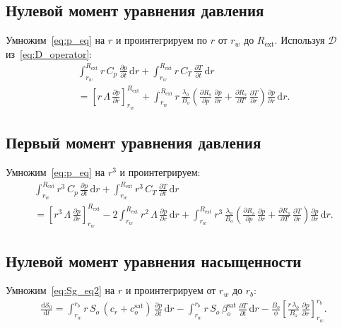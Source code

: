 \documentclass[12pt,a4paper]{article}
\newcommand{\dd}{\mathrm{d}}
\newcommand{\pp}{\partial}
\newcommand{\ext}{\mathrm{ext}}
\newcommand{\sat}{\mathrm{sat}}
\begin{document}
\subsection{Нулевой момент уравнения давления}

Умножим~\eqref{eq:p_eq} на $r$ и проинтегрируем по $r$
от $r_w$ до $R_\ext$. Используя $\mathcal{D}$
из~\eqref{eq:D_operator}:
\begin{multline}\label{eq:moment0}
    \int_{r_w}^{R_\ext} r\,C_p\,\frac{\pp p}{\pp t}\,\dd r
    + \int_{r_w}^{R_\ext} r\,C_T\,\frac{\pp T}{\pp t}\,\dd r
   \\
    = \left[r\,\Lambda\,\frac{\pp p}{\pp r}\right]_{r_w}^{R_\ext}
    + \int_{r_w}^{R_\ext}
      r\,\frac{\lambda_o}{B_o}\!\left(
        \frac{\pp R_s}{\pp p}\,\frac{\pp p}{\pp r}
        + \frac{\pp R_s}{\pp T}\,\frac{\pp T}{\pp r}
      \right)\frac{\pp p}{\pp r}\,\dd r.
\end{multline}



\subsection{Первый момент уравнения давления}

Умножим~\eqref{eq:p_eq} на $r^3$ и проинтегрируем:
\begin{multline}\label{eq:moment1}
  \int_{r_w}^{R_\ext} r^3\,C_p\,\frac{\pp p}{\pp t}\,\dd r
  + \int_{r_w}^{R_\ext} r^3\,C_T\,\frac{\pp T}{\pp t}\,\dd r \\
  = \left[r^3\,\Lambda\,\frac{\pp p}{\pp r}\right]_{r_w}^{R_\ext}
    - 2\int_{r_w}^{R_\ext} r^2\,\Lambda\,\frac{\pp p}{\pp r}\,\dd r
  + \int_{r_w}^{R_\ext}
    r^3\,\frac{\lambda_o}{B_o}\!\left(
      \frac{\pp R_s}{\pp p}\,\frac{\pp p}{\pp r}
      + \frac{\pp R_s}{\pp T}\,\frac{\pp T}{\pp r}
    \right)\frac{\pp p}{\pp r}\,\dd r.
\end{multline}

\subsection{Нулевой момент уравнения насыщенности}

Умножим~\eqref{eq:Sg_eq2} на $r$ и проинтегрируем от $r_w$ до $r_b$:
\begin{multline}\label{eq:Sg_moment0}
  \frac{\dd\mathcal{S}_0}{\dd t}
  = \int_{r_w}^{r_b} r\,S_o\,(c_r+c_o^\sat)\,
      \frac{\pp p}{\pp t}\,\dd r
    - \int_{r_w}^{r_b} r\,S_o\,\beta_o^\sat\,
      \frac{\pp T}{\pp t}\,\dd r 
  - \frac{B_o}{\phi}\!\left[
      \frac{r\,\lambda_o}{B_o}\,\frac{\pp p}{\pp r}
    \right]_{r_w}^{r_b}.
\end{multline}
\end{document}
